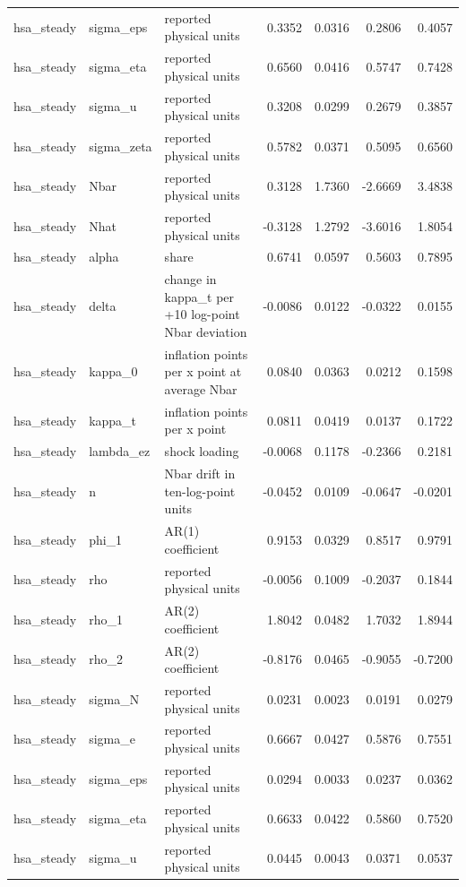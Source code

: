 \begin{tabular}{lllrrrr}
hsa\_steady & sigma\_eps & reported physical units & 0.3352 & 0.0316 & 0.2806 & 0.4057 \\
hsa\_steady & sigma\_eta & reported physical units & 0.6560 & 0.0416 & 0.5747 & 0.7428 \\
hsa\_steady & sigma\_u & reported physical units & 0.3208 & 0.0299 & 0.2679 & 0.3857 \\
hsa\_steady & sigma\_zeta & reported physical units & 0.5782 & 0.0371 & 0.5095 & 0.6560 \\
hsa\_steady & Nbar & reported physical units & 0.3128 & 1.7360 & -2.6669 & 3.4838 \\
hsa\_steady & Nhat & reported physical units & -0.3128 & 1.2792 & -3.6016 & 1.8054 \\
hsa\_steady & alpha & share & 0.6741 & 0.0597 & 0.5603 & 0.7895 \\
hsa\_steady & delta & change in kappa\_t per +10 log-point Nbar deviation & -0.0086 & 0.0122 & -0.0322 & 0.0155 \\
hsa\_steady & kappa\_0 & inflation points per x point at average Nbar & 0.0840 & 0.0363 & 0.0212 & 0.1598 \\
hsa\_steady & kappa\_t & inflation points per x point & 0.0811 & 0.0419 & 0.0137 & 0.1722 \\
hsa\_steady & lambda\_ez & shock loading & -0.0068 & 0.1178 & -0.2366 & 0.2181 \\
hsa\_steady & n & Nbar drift in ten-log-point units & -0.0452 & 0.0109 & -0.0647 & -0.0201 \\
hsa\_steady & phi\_1 & AR(1) coefficient & 0.9153 & 0.0329 & 0.8517 & 0.9791 \\
hsa\_steady & rho & reported physical units & -0.0056 & 0.1009 & -0.2037 & 0.1844 \\
hsa\_steady & rho\_1 & AR(2) coefficient & 1.8042 & 0.0482 & 1.7032 & 1.8944 \\
hsa\_steady & rho\_2 & AR(2) coefficient & -0.8176 & 0.0465 & -0.9055 & -0.7200 \\
hsa\_steady & sigma\_N & reported physical units & 0.0231 & 0.0023 & 0.0191 & 0.0279 \\
hsa\_steady & sigma\_e & reported physical units & 0.6667 & 0.0427 & 0.5876 & 0.7551 \\
hsa\_steady & sigma\_eps & reported physical units & 0.0294 & 0.0033 & 0.0237 & 0.0362 \\
hsa\_steady & sigma\_eta & reported physical units & 0.6633 & 0.0422 & 0.5860 & 0.7520 \\
hsa\_steady & sigma\_u & reported physical units & 0.0445 & 0.0043 & 0.0371 & 0.0537 \\

\end{tabular}
